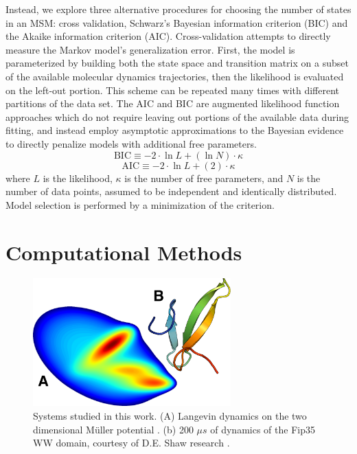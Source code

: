 \documentclass[journal=jpcbfk, layout=traditional, manuscript=article]{achemso}
\begin{document}
Instead, we explore three alternative procedures for choosing the number of states in an MSM: cross validation, Schwarz's Bayesian information criterion (BIC)\cite{Schwartz78Estimating} and the Akaike information criterion (AIC)\cite{Akaike1974AIC}. Cross-validation attempts to directly measure the Markov model's generalization error. First, the model is parameterized by building both the state space and transition matrix on a subset of the available molecular dynamics trajectories, then the likelihood is evaluated on the left-out portion. This scheme can be repeated many times with different partitions of the data set. The AIC and BIC are augmented likelihood function approaches which do not require leaving out portions of the available data during fitting, and instead employ asymptotic approximations to the Bayesian evidence to directly penalize models with additional free parameters.
\begin{equation}
\label{eq:bic}
\mathrm{BIC} \equiv -2\cdot \ln L + \left(\ln N \right)\cdot \kappa
\end{equation}
\begin{equation}
\label{eq:aic}
\mathrm{AIC} \equiv -2\cdot \ln L + \left(2\right) \cdot \kappa
\end{equation} where $L$ is the likelihood, $\kappa$ is the number of free parameters, and $N$ is the number of data points, assumed to be independent and identically distributed. Model selection is performed by a minimization of the criterion.

\section{Computational Methods}

\begin{figure}
\centering
\includegraphics[width=3in]{figs_final/mull_ww.png}
\caption{Systems studied in this work. (A) Langevin dynamics on the two dimensional M\"{u}ller potential \cite{Muller1980Reaction}. (b) 200 $\mu s$ of dynamics of the Fip35 WW domain\cite{Liu2008Experimental}, courtesy of D.E. Shaw research \cite{Shaw2010Atomic}.}
\label{fig:pics}
\end{figure}
\end{document}
